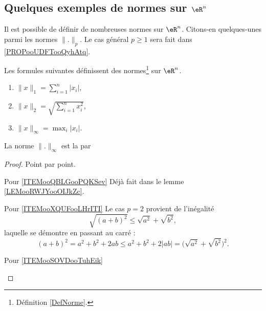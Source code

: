 \subsection{Quelques exemples de normes sur \texorpdfstring{$\eR^n$}{Rn}}

Il est possible de définir de nombreuses normes sur $\eR^n$. Citons-en quelques-unes parmi les normes \( \| . \|_p\). Le cas général \( p\geq 1\) sera fait dans \ref{PROPooUDFTooQyhAtq}.

\begin{propositionDef}      \label{PROPooCLZRooIRxCnZ}
    Les formules suivantes définissent des normes\footnote{Définition \ref{DefNorme}.} sur \( \eR^n\).
    \begin{enumerate}
        \item       \label{ITEMooQBLGooPQKSev}
            \( \| x \|_1=\sum_{i=1}^n| x_i |\),
        \item       \label{ITEMooXQUFooLHrITI}
            \( \| x \|_2=\sqrt{ \sum_{i=1}^nx_i^2 }\),
        \item       \label{ITEMooSOVDooTuhEik}
	        $   \| x \|_{\infty}=\max_i| x_i |$.
    \end{enumerate}
    La norme \( \| . \|_{\infty}\) est la   par
\end{propositionDef}

\begin{proof}
    Point par point.
    \begin{subproof}
    \item[Pour \ref{ITEMooQBLGooPQKSev}]
            Déjà fait dans le lemme \ref{LEMooRWJYooOIJkZc}.
        \item[Pour \ref{ITEMooXQUFooLHrITI}]
            Le cas \( p=2\) provient de l'inégalité
    \begin{equation}
        \sqrt{ (a+b)^2 }\leq \sqrt{ a^2 }+\sqrt{ b^2 },
    \end{equation}
    laquelle se démontre en passant au carré :
    \begin{equation}        \label{EQooRYNYooTzZpPz}
        (a+b)^2=a^2+b^2+2ab\leq a^2+b^2+2| ab |=\big( \sqrt{ a^2 }+\sqrt{ b^2 } \big)^2.
    \end{equation}
\item[Pour \ref{ITEMooSOVDooTuhEik}]

    \end{subproof}
\end{proof}

